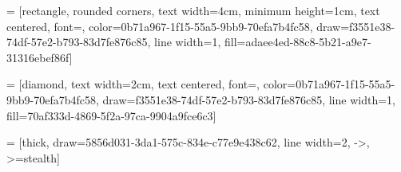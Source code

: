 
 = [rectangle, rounded corners, text width=4cm, minimum height=1cm, text centered, font=\normalsize, color=0b71a967-1f15-55a5-9bb9-70efa7b4fc58, draw=f3551e38-74df-57e2-b793-83d7fe876c85, line width=1, fill=adaee4ed-88c8-5b21-a9e7-31316ebef86f]

 = [diamond, text width=2cm, text centered, font=\normalsize, color=0b71a967-1f15-55a5-9bb9-70efa7b4fc58, draw=f3551e38-74df-57e2-b793-83d7fe876c85, line width=1, fill=70af333d-4869-5f2a-97ca-9904a9fce6c3]

 = [thick, draw=5856d031-3da1-575c-834e-c77e9e438c62, line width=2, ->, >=stealth]



